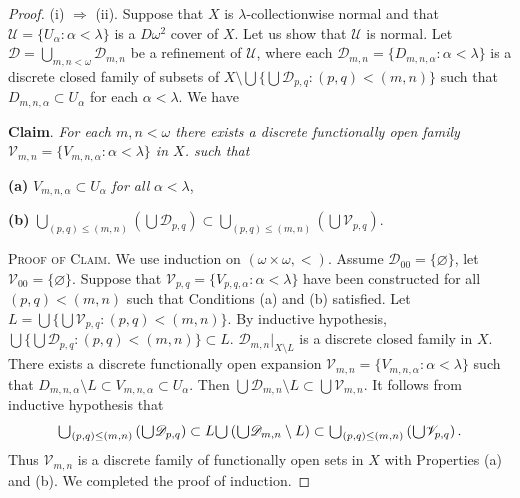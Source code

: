 \documentclass[main.tex]{subfiles}
\begin{document}
\begin{proof}
(i) $\Rightarrow$ (ii). Suppose that $X$ is $\lambda$-collectionwise normal and
 that $\mathscr{U} = \{U_\alpha: \alpha < \lambda\}$ is a $D\omega^2$ 
cover of $X$. Let us show that $\mathscr{U}$ is normal.
Let $\mathscr{D} = \bigcup_{m,n < \omega} \mathscr{D}_{m,n}$ be a refinement of
$\mathscr{U}$, where each $\mathscr{D}_{m,n} = \{D_{m,n,\alpha}: \alpha < \lambda\}$ 
is a discrete closed family of subsets of 
$X\setminus \bigcup\{\bigcup \mathscr{D}_{p,q}: (p,q) < (m,n)\}$ such that 
$D_{m,n,\alpha} \subset U_\alpha$ for each $\alpha < \lambda$. We have 

\textbf{Claim}. 
 \textit{For each $m, n < \omega$ there exists a discrete functionally open family 
 $\mathscr{V}_{m,n} = \{V_{m,n,\alpha}: \alpha < \lambda\}$ in $X$. such that}

\textbf{(a)} $V_{m,n,\alpha} \subset U_\alpha$ \textit{ for all } $\alpha < \lambda$,

\textbf{(b)}
$\bigcup_{(p,q)\le(m,n)}(\bigcup \mathscr{D}_{p,q})\subset 
\bigcup_{(p,q)\le (m,n)}(\bigcup\mathscr{V}_{p,q})$.

\noindent\textsc{Proof of Claim}. We use induction on $(\omega\times\omega, <)$.
Assume $\mathscr{D}_{00}=\{\varnothing\}$, let $\mathscr{V}_{00}=\{\varnothing\}$.
Suppose that $\mathscr{V}_{p,q}=\{V_{p,q,\alpha}:\alpha<\lambda\}$ have 
been constructed for all  $(p,q) < (m,n)$ such that 
Conditions (a) and (b)
satisfied. Let $L=\bigcup\{\bigcup\mathscr{V}_{p,q}: (p,q)<(m,n)\}$.
By inductive hypothesis,
$\bigcup\{\bigcup\mathscr{D}_{p,q}: (p,q)<(m,n)\} \subset L$.
$\mathscr{D}_{m,n}|_{X\setminus L}$ is  
a discrete closed family in $X$. There exists a
discrete functionally open expansion 
$\mathscr{V}_{m,n} = \{V_{m,n,\alpha}: \alpha < \lambda\}$ such that 
$D_{m, n, \alpha}\setminus L\subset V_{m,n,\alpha}\subset U_\alpha$.
Then $\bigcup\mathscr{D}_{m,n}\setminus L\subset \bigcup\mathscr{V}_{m,n}$. It follows
from inductive hypothesis that 
$$\raisebox{-2pt}{\scalebox{1.5}{$\cup$}}_{(p,q)\le (m,n)}\left(\raisebox{-2pt}{\scalebox{1.5}{$\cup$}}\mathscr{D}_{p,q}\right) \subset 
 L\raisebox{-2pt}{\scalebox{1.5}{$\cup$}}
  \left(\raisebox{-2pt}{\scalebox{1.5}{$\cup$}}\mathscr{D}_{m,n}\setminus L\right) \subset 
 \raisebox{-2pt}{\scalebox{1.5}{$\cup$}}_{(p,q)\le (m,n)}\left(\raisebox{-2pt}{\scalebox{1.5}{$\cup$}}\mathscr{V}_{p,q}\right).$$
 Thus $\mathscr{V}_{m,n}$ is a discrete family of functionally open sets 
 in $X$ with Properties (a) and (b). We completed the proof of induction.
 

\end{proof}
\end{document}
